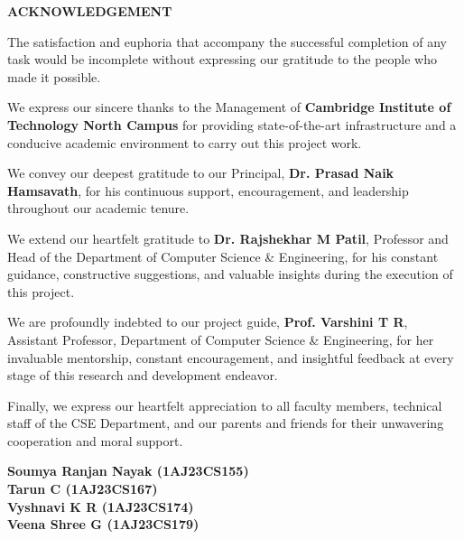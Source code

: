 \documentclass[12pt,a4paper]{article}
\begin{document}
\newpage

\label{page:acknowledgement}
\begin{center}
{\fontsize{16}{20}\bfseries\color{vtuBlue} ACKNOWLEDGEMENT\\[12pt]}
\end{center}

The satisfaction and euphoria that accompany the successful completion of any task would be incomplete without expressing our gratitude to the people who made it possible.

We express our sincere thanks to the Management of \textbf{Cambridge Institute of Technology North Campus} for providing state-of-the-art infrastructure and a conducive academic environment to carry out this project work.

We convey our deepest gratitude to our Principal, \textbf{Dr. Prasad Naik Hamsavath}, for his continuous support, encouragement, and leadership throughout our academic tenure.

We extend our heartfelt gratitude to \textbf{Dr. Rajshekhar M Patil}, Professor and Head of the Department of Computer Science \& Engineering, for his constant guidance, constructive suggestions, and valuable insights during the execution of this project.

We are profoundly indebted to our project guide, \textbf{Prof. Varshini T R}, Assistant Professor, Department of Computer Science \& Engineering, for her invaluable mentorship, constant encouragement, and insightful feedback at every stage of this research and development endeavor.

Finally, we express our heartfelt appreciation to all faculty members, technical staff of the CSE Department, and our parents and friends for their unwavering cooperation and moral support.

\vspace{1cm}
\noindent
\begin{minipage}[t]{\textwidth}
\raggedleft
\textbf{Soumya Ranjan Nayak (1AJ23CS155)}\\
\textbf{Tarun C (1AJ23CS167)}\\
\textbf{Vyshnavi K R (1AJ23CS174)}\\
\textbf{Veena Shree G (1AJ23CS179)}
\end{minipage}

\newpage
\end{document}
